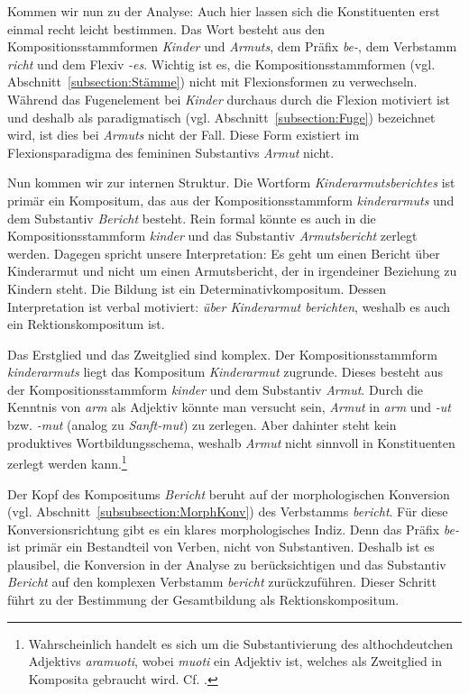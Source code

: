 Kommen wir nun zu der Analyse: Auch hier lassen sich die Konstituenten erst einmal recht leicht bestimmen. Das Wort besteht aus den Kompositionsstammformen  \textit{Kinder} und \textit{Armuts}, dem Präfix \textit{be-}, dem Verbstamm \textit{richt} und dem Flexiv \textit{-es}. Wichtig ist es, die Kompositionsstammformen (vgl. Abschnitt~\ref{subsection:Stämme}) nicht mit Flexionsformen zu verwechseln. Während das Fugenelement bei \textit{Kinder} durchaus durch die Flexion motiviert ist und deshalb als paradigmatisch (vgl. Abschnitt~\ref{subsection:Fuge}) bezeichnet wird, ist dies bei \textit{Armuts} nicht der Fall. Diese Form existiert im Flexionsparadigma des femininen Substantivs \textit{Armut} nicht.

Nun kommen wir zur internen Struktur. Die Wortform \textit{Kinderarmutsberichtes} ist primär ein Kompositum, das aus der Kompositionsstammform \textit{kinderarmuts} und dem Substantiv \textit{Bericht} besteht. Rein formal könnte es auch in die Kompositionsstammform \textit{kinder} und das Substantiv \textit{Armutsbericht} zerlegt werden. Dagegen spricht unsere Interpretation: Es geht um einen Bericht über Kinderarmut und nicht um einen Armutsbericht, der in irgendeiner Beziehung zu Kindern steht. Die Bildung ist ein Determinativkompositum. Dessen Interpretation ist verbal motiviert: \textit{über Kinderarmut berichten}, weshalb es auch ein Rektionskompositum ist.

Das Erstglied und das Zweitglied sind komplex. Der Kompositionsstammform \textit{kinderarmuts} liegt das Kompositum \textit{Kinderarmut} zugrunde. Dieses besteht aus der Kompositionsstammform \textit{kinder} und dem Substantiv \textit{Armut}. Durch die Kenntnis von \textit{arm} als Adjektiv könnte man versucht sein, \textit{Armut} in \textit{arm} und \textit{-ut} bzw. \textit{-mut} (analog zu \textit{Sanft-mut}) zu zerlegen. Aber dahinter steht kein produktives Wortbildungsschema, weshalb \textit{Armut} nicht sinnvoll in Konstituenten zerlegt werden kann.\footnote{Wahrscheinlich handelt es sich um die Substantivierung des althochdeutchen Adjektivs \textit{aramuoti}, wobei \textit{muoti} ein Adjektiv ist, welches als Zweitglied in Komposita gebraucht wird. Cf. \citet[104--105]{Paul1920Wb}.}


Der Kopf des Kompositums \textit{Bericht} beruht auf der morphologischen Konversion (vgl. Abschnitt~\ref{subsubsection:MorphKonv}) des Verbstamms \textit{bericht}. Für diese Konversionsrichtung gibt es ein klares morphologisches Indiz. Denn das Präfix \textit{be-} ist primär ein Bestandteil von Verben, nicht von Substantiven. Deshalb ist es plausibel, die Konversion in der Analyse zu berücksichtigen und das Substantiv \textit{Bericht} auf den komplexen Verbstamm \textit{bericht} zurückzuführen. Dieser Schritt führt zu der Bestimmung der Gesamtbildung als Rektionskompositum. 

